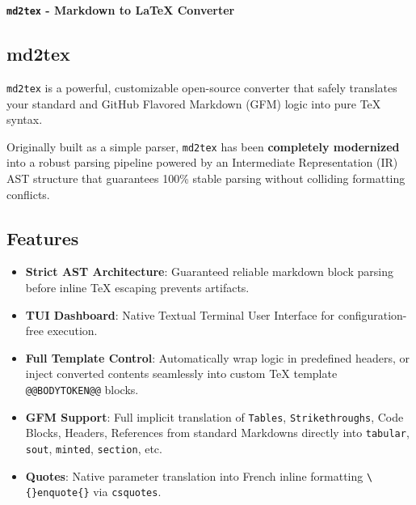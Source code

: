 \documentclass[a4paper, 12pt, twoside]{article}
\begin{document}
\begin{titlepage}
    \vspace*{5cm}
    \begin{center}
        \Huge \textbf{\texttt{md2tex} - Markdown to LaTeX Converter}
    \end{center}
    \vfill
\end{titlepage}

\tableofcontents
\clearpage

\subsection*{md2tex}

\texttt{md2tex} is a powerful, customizable open-source converter that safely translates your standard and GitHub Flavored Markdown (GFM) logic into pure TeX syntax. 

Originally built as a simple parser, \texttt{md2tex} has been \textbf{completely modernized} into a robust parsing pipeline powered by an Intermediate Representation (IR) AST structure that guarantees 100\% stable parsing without colliding formatting conflicts.

\subsection*{Features}

\begin{itemize}
    \item \textbf{Strict AST Architecture}: Guaranteed reliable markdown block parsing before inline TeX escaping prevents artifacts.
    \item \textbf{TUI Dashboard}: Native Textual Terminal User Interface for configuration-free execution.
    \item \textbf{Full Template Control}: Automatically wrap logic in predefined headers, or inject converted contents seamlessly into custom TeX template \texttt{@@BODYTOKEN@@} blocks.
    \item \textbf{GFM Support}: Full implicit translation of \texttt{Tables}, \texttt{Strikethroughs}, Code Blocks, Headers, References from standard Markdowns directly into \texttt{tabular}, \texttt{sout}, \texttt{minted}, \texttt{section}, etc.
    \item \textbf{Quotes}: Native parameter translation into French inline formatting \texttt{\textbackslash\{\}enquote\{\}} via \texttt{csquotes}.
\end{itemize}
\end{document}
